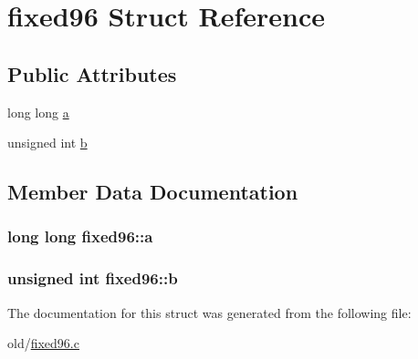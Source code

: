 \hypertarget{structfixed96}{
\section{fixed96 Struct Reference}
\label{structfixed96}
}
\subsection*{Public Attributes}
\begin{DoxyCompactItemize}
\item 
long long \hyperlink{structfixed96_a429253e2502400da27dad001499453c6}{a}
\item 
unsigned int \hyperlink{structfixed96_a459193a45d15da019e5780d771f34844}{b}
\end{DoxyCompactItemize}


\subsection{Member Data Documentation}
\hypertarget{structfixed96_a429253e2502400da27dad001499453c6}{
\subsubsection[{a}]{\setlength{\rightskip}{0pt plus 5cm}long long {\bf fixed96::a}}}
\label{structfixed96_a429253e2502400da27dad001499453c6}
\hypertarget{structfixed96_a459193a45d15da019e5780d771f34844}{
\subsubsection[{b}]{\setlength{\rightskip}{0pt plus 5cm}unsigned int {\bf fixed96::b}}}
\label{structfixed96_a459193a45d15da019e5780d771f34844}


The documentation for this struct was generated from the following file:\begin{DoxyCompactItemize}
\item 
old/\hyperlink{fixed96_8c}{fixed96.c}\end{DoxyCompactItemize}
